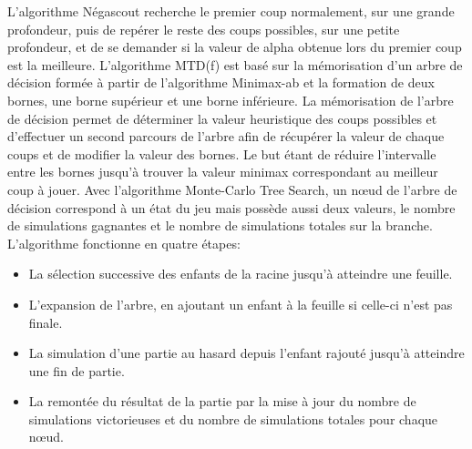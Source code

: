 \documentclass{article}
\begin{document}
\newline\newline
L'algorithme Négascout recherche le premier coup normalement, sur une grande profondeur, puis de repérer le reste des coups possibles, sur une petite profondeur, et de se demander si la valeur de alpha obtenue lors du premier coup est la meilleure\cite{Negascout}.
\newline\newline
L'algorithme MTD(f) est basé sur la mémorisation d'un arbre de décision formée à partir de l'algorithme Minimax-ab et la formation de deux bornes, une borne supérieur et une borne inférieure. La mémorisation de l'arbre de décision permet de déterminer la valeur heuristique des coups possibles et d'effectuer un second parcours de l'arbre afin de récupérer la valeur de chaque coups et de modifier la valeur des bornes.
\newline
Le but étant de réduire l'intervalle entre les bornes jusqu'à trouver la valeur minimax correspondant au meilleur coup à jouer\cite{MTD(f)}.
\newline\newline
Avec l'algorithme Monte-Carlo Tree Search, un nœud de l'arbre de décision correspond à un état du jeu mais possède aussi deux valeurs, le nombre de simulations gagnantes et le nombre de simulations totales sur la branche.
L'algorithme fonctionne en quatre étapes\cite{MonteCarlo}:
\begin{itemize}
\item La sélection successive des enfants de la racine jusqu'à atteindre une feuille.
\item L'expansion de l'arbre, en ajoutant un enfant à la feuille si celle-ci n'est pas finale.
\item La simulation d'une partie au hasard depuis l'enfant rajouté jusqu'à atteindre une fin de partie.
\item La remontée du résultat de la partie par la mise à jour du nombre de simulations victorieuses et du nombre de simulations totales pour chaque nœud.
\end{itemize}
\end{document}

